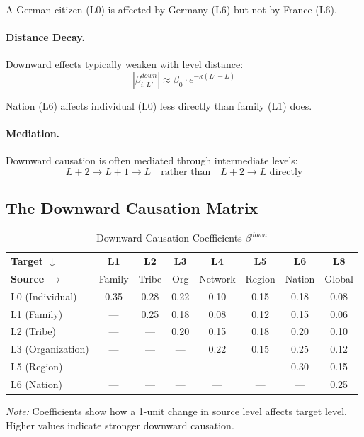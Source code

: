 A German citizen (L0) is affected by Germany (L6) but not by France (L6).

\paragraph{Distance Decay.}
Downward effects typically weaken with level distance:
\begin{equation}
|\beta^{down}_{i,L'}| \approx \beta_0 \cdot e^{-\kappa(L' - L)}
\end{equation}

Nation (L6) affects individual (L0) less directly than family (L1) does.

\paragraph{Mediation.}
Downward causation is often mediated through intermediate levels:
\begin{equation}
L+2 \to L+1 \to L \quad \text{rather than} \quad L+2 \to L \text{ directly}
\end{equation}

\subsection{The Downward Causation Matrix}

\begin{table}[htbp]
\centering
\caption{Downward Causation Coefficients $\beta^{down}$}
\label{tab:aaa-downward-matrix}
\renewcommand{\arraystretch}{1.3}
\small
\begin{tabular}{@{}l|ccccccc@{}}
\toprule
\textbf{Target $\downarrow$} & \textbf{L1} & \textbf{L2} & \textbf{L3} & \textbf{L4} & \textbf{L5} & \textbf{L6} & \textbf{L8} \\
\textbf{Source $\rightarrow$} & Family & Tribe & Org & Network & Region & Nation & Global \\
\midrule
L0 (Individual) & 0.35 & 0.28 & 0.22 & 0.10 & 0.15 & 0.18 & 0.08 \\
L1 (Family) & --- & 0.25 & 0.18 & 0.08 & 0.12 & 0.15 & 0.06 \\
L2 (Tribe) & --- & --- & 0.20 & 0.15 & 0.18 & 0.20 & 0.10 \\
L3 (Organization) & --- & --- & --- & 0.22 & 0.15 & 0.25 & 0.12 \\
L5 (Region) & --- & --- & --- & --- & --- & 0.30 & 0.15 \\
L6 (Nation) & --- & --- & --- & --- & --- & --- & 0.25 \\
\bottomrule
\end{tabular}
\begin{flushleft}
\small\textit{Note:} Coefficients show how a 1-unit change in source level affects target level.
Higher values indicate stronger downward causation.
\end{flushleft}
\end{table}

